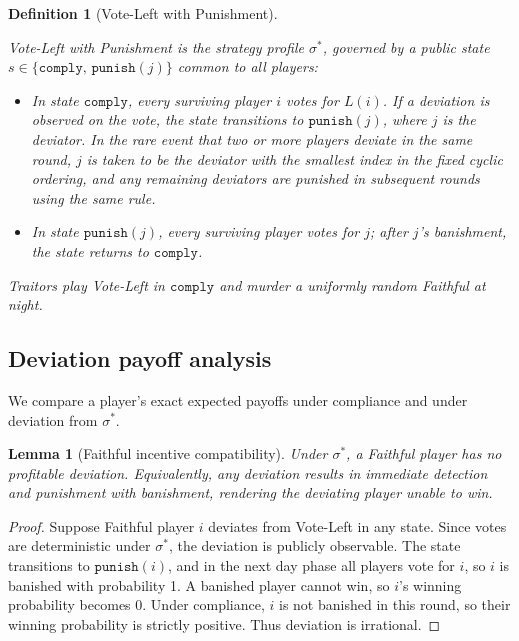 \documentclass[11pt,a4paper]{article}
\newtheorem{lemma}{Lemma}
\newtheorem{definition}{Definition}
\begin{document}
\begin{definition}[Vote-Left with Punishment]\label{def:equil}

Vote-Left with Punishment is the strategy profile \(\sigma^*\), governed by a
public state \(s \in \{\mathtt{comply},\, \mathtt{punish}(j)\}\) common to all
players:
\begin{itemize}[leftmargin=1.4em,itemsep=1pt,topsep=2pt]
    \item In state \(\mathtt{comply}\), every surviving player \(i\) votes for
  \(L(i)\). If a deviation is observed on the vote, the state transitions to
  \(\mathtt{punish}(j)\), where \(j\) is the deviator. In the rare event that
  two or more players deviate in the same round, \(j\) is taken to be the
  deviator with the smallest index in the fixed cyclic ordering, and any
  remaining deviators are punished in subsequent rounds using the same rule.
\item In state \(\mathtt{punish}(j)\), every surviving player votes for
  \(j\); after \(j\)'s banishment, the state returns to \(\mathtt{comply}\).
\end{itemize}
Traitors play Vote-Left in \(\mathtt{comply}\) and murder a uniformly random
Faithful at night.
\end{definition}


\subsection{Deviation payoff analysis}

We compare a player's exact expected payoffs under compliance and under
deviation from \(\sigma^*\). 

\begin{lemma}[Faithful incentive compatibility]\label{lemma:faithful}
Under \(\sigma^*\), a Faithful player has no profitable deviation.
Equivalently, any deviation results in immediate detection and punishment
with banishment, rendering the deviating player unable to win.
\end{lemma}

\begin{proof}
Suppose Faithful player \(i\) deviates from Vote-Left in any state. Since
votes are deterministic under \(\sigma^*\), the deviation is publicly
observable. The state transitions to \(\mathtt{punish}(i)\), and in the
next day phase all players vote for \(i\), so \(i\) is banished with
probability 1. A banished player cannot win, so \(i\)'s winning probability
becomes 0. Under compliance, \(i\) is not banished in this round, so their
winning probability is strictly positive. Thus deviation is irrational.
\end{proof}
\end{document}
